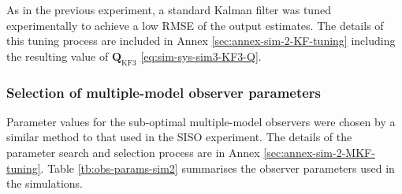 As in the previous experiment, a standard Kalman filter was tuned experimentally to achieve a low \gls{RMSE} of the output estimates. The details of this tuning process are included in Annex \ref{sec:annex-sim-2-KF-tuning} including the resulting value of $\mathbf{Q}_{\text{KF3}}$ \eqref{eq:sim-sys-sim3-KF3-Q}.


\subsubsection{Selection of multiple-model observer parameters} \label{sec:sim-obs-lin-2-MKF-tuning}

Parameter values for the sub-optimal multiple-model observers were chosen by a similar method to that used in the SISO experiment. The details of the parameter search and selection process are in Annex \ref{sec:annex-sim-2-MKF-tuning}. Table \ref{tb:obs-params-sim2} summarises the observer parameters used in the simulations.
